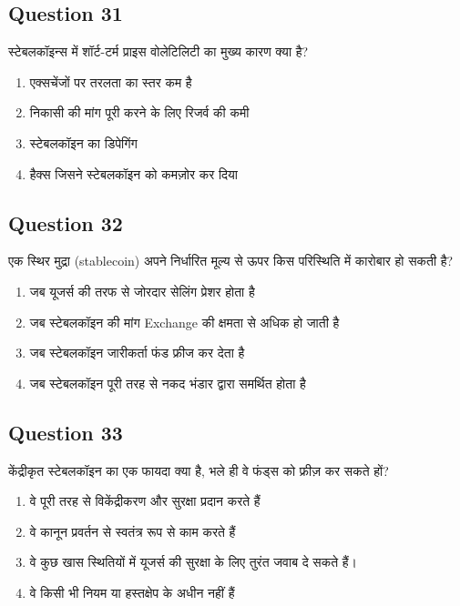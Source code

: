 \documentclass[12pt,a4paper]{article}
\begin{document}
\bigskip


\subsection*{Question 31}
स्टेबलकॉइन्स में शॉर्ट-टर्म प्राइस वोलेटिलिटी का मुख्य कारण क्या है?

\begin{enumerate}[label=\Alph*., leftmargin=*]
\item एक्सचेंजों पर तरलता का स्तर कम है
\item निकासी की मांग पूरी करने के लिए रिजर्व की कमी
\item स्टेबलकॉइन का डिपेगिंग
\item हैक्स जिसने स्टेबलकॉइन को कमज़ोर कर दिया
\end{enumerate}

\bigskip


\subsection*{Question 32}
एक स्थिर मुद्रा (stablecoin) अपने निर्धारित मूल्य से ऊपर किस परिस्थिति में कारोबार हो सकती है?

\begin{enumerate}[label=\Alph*., leftmargin=*]
\item जब यूजर्स की तरफ से जोरदार सेलिंग प्रेशर होता है
\item जब स्टेबलकॉइन की मांग Exchange की क्षमता से अधिक हो जाती है
\item जब स्टेबलकॉइन जारीकर्ता फंड फ्रीज कर देता है
\item जब स्टेबलकॉइन पूरी तरह से नकद भंडार द्वारा समर्थित होता है
\end{enumerate}

\bigskip


\subsection*{Question 33}
केंद्रीकृत स्टेबलकॉइन का एक फायदा क्या है, भले ही वे फंड्स को फ्रीज़ कर सकते हों?

\begin{enumerate}[label=\Alph*., leftmargin=*]
\item वे पूरी तरह से विकेंद्रीकरण और सुरक्षा प्रदान करते हैं
\item वे कानून प्रवर्तन से स्वतंत्र रूप से काम करते हैं
\item वे कुछ खास स्थितियों में यूजर्स की सुरक्षा के लिए तुरंत जवाब दे सकते हैं।
\item वे किसी भी नियम या हस्तक्षेप के अधीन नहीं हैं
\end{enumerate}
\end{document}
